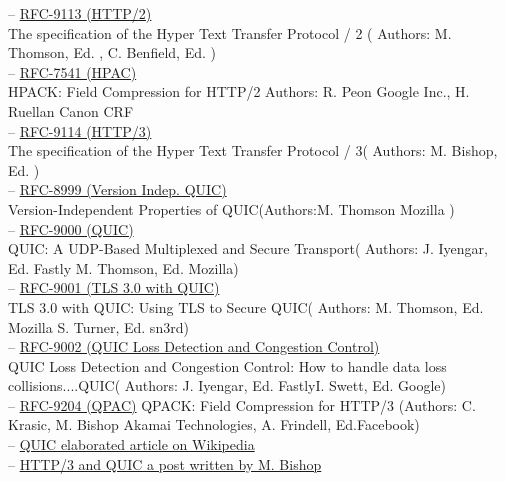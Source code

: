 \documentclass[10pt,a4paper,english]{article}
\begin{document}
\begin{multicols}{2}
\begin{flushleft}
\hspace*{1em}-- \href{https://www.rfc-editor.org/rfc/rfc9113.pdf}{RFC-9113 (HTTP/2)} \\The specification of the Hyper Text Transfer Protocol / 2 ( Authors:             M. Thomson, Ed. , C. Benfield, Ed. )\\
\hspace*{1em}-- \href{https://www.rfc-editor.org/rfc/pdfrfc/rfc7541.txt.pdf}{RFC-7541 (HPAC)} \\HPACK: Field Compression for HTTP/2 Authors:  R. Peon Google Inc., H. Ruellan Canon CRF\\
\hspace*{1em}-- \href{https://www.rfc-editor.org/rfc/rfc9114.pdf}{RFC-9114 (HTTP/3)} \\The specification of the Hyper Text Transfer Protocol / 3( Authors: M. Bishop, Ed. ) \\
\hspace*{1em}-- \href{https://www.rfc-editor.org/rfc/rfc8999.pdf}{RFC-8999 (Version Indep. QUIC)} \\Version-Independent Properties of QUIC(Authors:M. Thomson Mozilla ) \\
\hspace*{1em}-- \href{https://www.rfc-editor.org/rfc/rfc9000.pdf}{RFC-9000 (QUIC)} \\QUIC: A UDP-Based Multiplexed and Secure Transport( Authors: J. Iyengar, Ed. Fastly
M. Thomson, Ed. Mozilla) \\
\hspace*{1em}-- \href{https://www.rfc-editor.org/rfc/rfc9001.pdf}{RFC-9001 (TLS 3.0 with QUIC)} \\TLS 3.0 with QUIC: Using TLS to Secure QUIC( Authors: M. Thomson, Ed. Mozilla
S. Turner, Ed. sn3rd) \\
\hspace*{1em}-- \href{https://www.rfc-editor.org/rfc/rfc9002.pdf}{RFC-9002 (QUIC Loss Detection and Congestion Control)} \\QUIC Loss Detection and Congestion Control: How to handle data loss collisions....QUIC( Authors: J. Iyengar, Ed. FastlyI. Swett, Ed. Google) \\
\hspace*{1em}-- \href{https://www.rfc-editor.org/rfc/rfc9204.pdf}{RFC-9204 (QPAC)}  QPACK: Field Compression for HTTP/3 (Authors: C. Krasic, M. Bishop Akamai Technologies,
A. Frindell, Ed.Facebook) \\
\hspace*{1em}-- \href{https://en.wikipedia.org/wiki/QUIC}{QUIC elaborated article on Wikipedia}\\
\hspace*{1em}-- \href{https://www.akamai.com/blog/performance/http3-and-quic-past-present-and-future}{HTTP/3 and QUIC a post written by  M. Bishop}\\
\end{flushleft}
\end{multicols}
\end{document}
